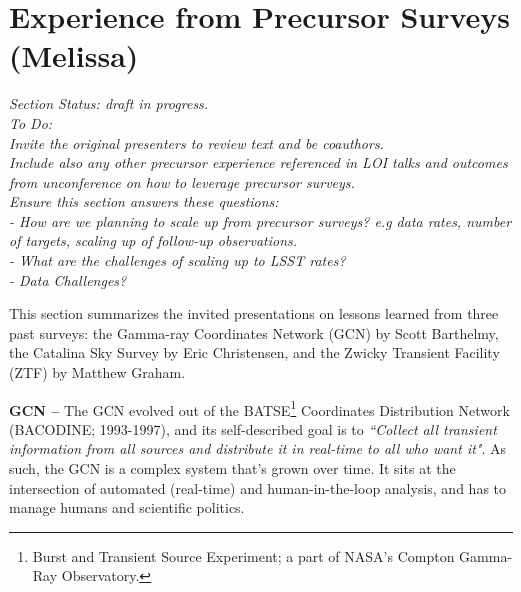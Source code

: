 \section{Experience from Precursor Surveys (Melissa) } \label{sec:precursor}

\noindent \textit{Section Status: draft in progress. \\
To Do: \\
Invite the original presenters to review text and be coauthors. \\
Include also any other precursor experience referenced in LOI talks and outcomes from unconference on how to leverage precursor surveys. \\
Ensure this section answers these questions: \\
 - How are we planning to scale up from precursor surveys? e.g data rates, number of targets, scaling up of follow-up observations. \\
 - What are the challenges of scaling up to LSST rates? \\ 
 - Data Challenges? \\
}



\medskip
This section summarizes the invited presentations on lessons learned from three past surveys: the Gamma-ray Coordinates Network (GCN) by Scott Barthelmy, the Catalina Sky Survey by Eric Christensen, and the Zwicky Transient Facility (ZTF) by Matthew Graham.

{\bf GCN --} The GCN evolved out of the BATSE\footnote{Burst and Transient Source Experiment; a part of NASA's Compton Gamma-Ray Observatory.} Coordinates Distribution Network (BACODINE; 1993-1997), and its self-described goal is to {\it ``Collect all transient information from all sources and distribute it in real-time to all who want it"}. As such, the GCN is a complex system that's grown over time. It sits at the intersection of automated (real-time) and human-in-the-loop analysis, and has to manage humans and scientific politics.

